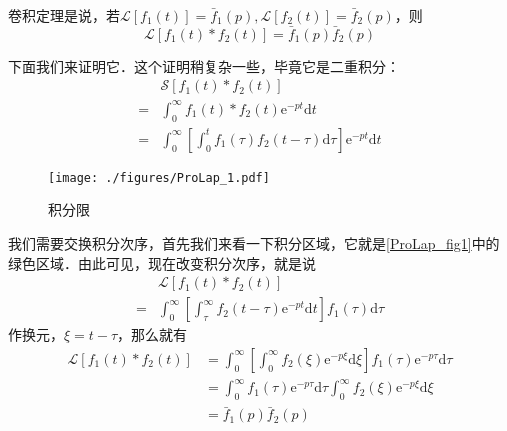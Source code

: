 卷积定理是说，若$\mathscr L[f_1(t)] = \bar f_1(p), \mathscr L[f_2(t)] = \bar f_2(p)$，则
\begin{equation}
\mathscr L[f_{1}(t) * f_{2}(t) ]= \bar{f}_{1}(p) \bar{f}_{2}(p)
\end{equation}

下面我们来证明它．这个证明稍复杂一些，毕竟它是二重积分：
\begin{equation}
\begin{aligned} & \mathscr{S}\left[f_{1}(t) * f_{2}(t)\right] \\=& \int_{0}^{\infty} f_{1}(t) * f_{2}(t) \mathrm{e}^{-p t} \mathrm{d} t \\=& \int_{0}^{\infty}\left[\int_{0}^{t} f_{1}(\tau) f_{2}(t-\tau) \mathrm{d} \tau\right] \mathrm{e}^{-p t} \mathrm{d} t \end{aligned}
\end{equation}
\begin{figure}[ht]
\centering
\texttt{[image: ./figures/ProLap\_1.pdf]}
\caption{积分限} \label{ProLap_fig1}
\end{figure}
我们需要交换积分次序，首先我们来看一下积分区域，它就是\autoref{ProLap_fig1}中的绿色区域．由此可见，现在改变积分次序，就是说
\begin{equation}
\begin{aligned} & \mathscr{L}\left[f_{1}(t) * f_{2}(t)\right] \\=& \int_{0}^{\infty}\left[\int_{\tau}^{\infty} f_{2}(t-\tau) \mathrm{e}^{-p t} \mathrm{d} t\right] f_{1}(\tau) \mathrm{d} \tau \end{aligned}
\end{equation}
作换元，$\xi=t-\tau$，那么就有
\begin{equation}
\begin{aligned} \mathscr{L}\left[f_{1}(t) * f_{2}(t)\right] &=\int_{0}^{\infty}\left[\int_{0}^{\infty} f_{2}(\xi) \mathrm{e}^{-p \xi} \mathrm{d} \xi\right] f_{1}(\tau) \mathrm{e}^{-p \tau} \mathrm{d} \tau \\ &=\int_{0}^{\infty} f_{1}(\tau) \mathrm{e}^{-p \tau} \mathrm{d} \tau \int_{0}^{\infty} f_{2}(\xi) \mathrm{e}^{-p \xi} \mathrm{d} \xi \\ &=\bar{f}_{1}(p) \bar{f}_{2}(p) \end{aligned}
\end{equation}